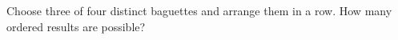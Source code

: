 Choose three of four distinct baguettes and arrange them in a row. How many ordered results are possible?

